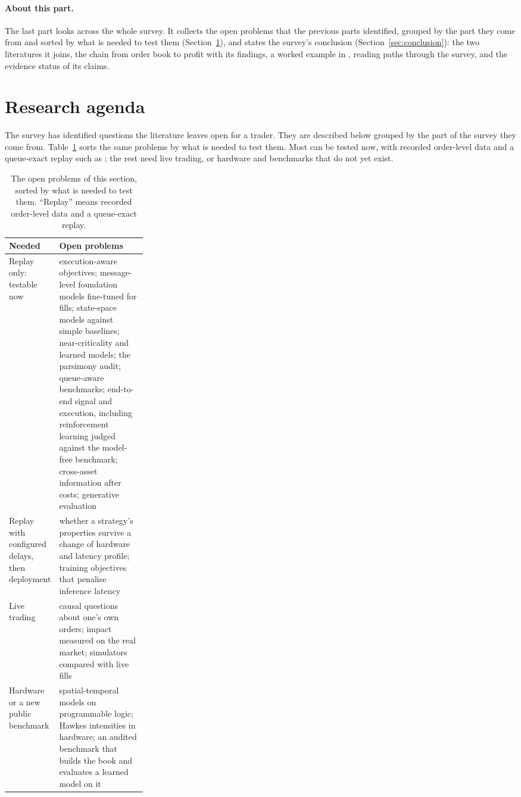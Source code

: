 \paragraph{About this part.} The last part looks across the whole survey. It collects the open problems that the
previous parts identified, grouped by the part they come from and sorted by what is needed to test them
(Section~\ref{sec:agenda}), and states the survey's conclusion (Section~\ref{sec:conclusion}): the two literatures
it joins, the chain from order book to profit with its findings, a worked example in \kasparhft{}, reading paths through the
survey, and the evidence status of its claims.

\section{Research agenda}
\label{sec:agenda}

The survey has identified questions the literature leaves open for a trader. They are described below
grouped by the part of the survey they come from. Table~\ref{tab:agenda-needs} sorts the same problems by what is
needed to test them. Most can be tested now, with recorded order-level data and a queue-exact replay such as \kasparhft{};
the rest need live trading, or hardware and benchmarks that do not yet exist.

\begin{table}[!htbp]
\centering\footnotesize
\caption{The open problems of this section, sorted by what is needed to test them. ``Replay'' means recorded
order-level data and a queue-exact replay.}
\label{tab:agenda-needs}
\begin{tabularx}{\linewidth}{>{\raggedright\arraybackslash}p{0.27\linewidth}>{\raggedright\arraybackslash}X}
\toprule
Needed & Open problems \\
\midrule
Replay only: testable now & execution-aware objectives; message-level foundation models fine-tuned for fills;
  state-space models against simple baselines; near-criticality and learned models; the parsimony audit;
  queue-aware benchmarks; end-to-end signal and execution, including reinforcement learning judged against the
  model-free benchmark; cross-asset information after costs; generative evaluation \\
\addlinespace
Replay with configured delays, then deployment & whether a strategy's properties survive a change of hardware and
  latency profile; training objectives that penalise inference latency \\
\addlinespace
Live trading & causal questions about one's own orders; impact measured on the real market; simulators
  compared with live fills \\
\addlinespace
Hardware or a new public benchmark & spatial-temporal models on programmable logic; Hawkes intensities in hardware;
  an audited benchmark that builds the book and evaluates a learned model on it \\
\bottomrule
\end{tabularx}
\end{table}

